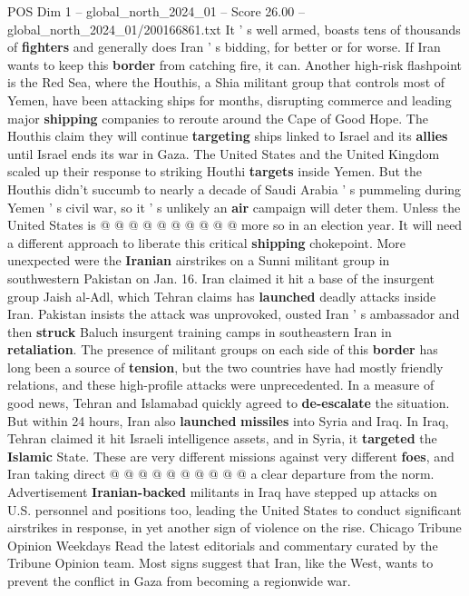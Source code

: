\begin{textsample}{POS Dim 1 – global\_north\_2024\_01 – Score 26.00 – global\_north\_2024\_01/200166861.txt}
It ' s well armed, boasts tens of thousands of \textbf{fighters} and generally does Iran ' s bidding, for better or for worse.
If Iran wants to keep this \textbf{border} from catching fire, it can.
Another high-risk flashpoint is the Red Sea, where the Houthis, a Shia militant group that controls most of Yemen, have been attacking ships for months, disrupting commerce and leading major \textbf{shipping} companies to reroute around the Cape of Good Hope.
The Houthis claim they will continue \textbf{targeting} ships linked to Israel and its \textbf{allies} until Israel ends its war in Gaza.
The United States and the United Kingdom scaled up their response to striking Houthi \textbf{targets} inside Yemen.
But the Houthis didn't succumb to nearly a decade of Saudi Arabia ' s pummeling during Yemen ' s civil war, so it ' s unlikely an \textbf{air} campaign will deter them.
Unless the United States is @ @ @ @ @ @ @ @ @ @ more so in an election year.
It will need a different approach to liberate this critical \textbf{shipping} chokepoint.
More unexpected were the \textbf{Iranian} airstrikes on a Sunni militant group in southwestern Pakistan on Jan. 16.
Iran claimed it hit a base of the insurgent group Jaish al-Adl, which Tehran claims has \textbf{launched} deadly attacks inside Iran.
Pakistan insists the attack was unprovoked, ousted Iran ' s ambassador and then \textbf{struck} Baluch insurgent training camps in southeastern Iran in \textbf{retaliation}.
The presence of militant groups on each side of this \textbf{border} has long been a source of \textbf{tension}, but the two countries have had mostly friendly relations, and these high-profile attacks were unprecedented.
In a measure of good news, Tehran and Islamabad quickly agreed to \textbf{de-escalate} the situation.
But within 24 hours, Iran also \textbf{launched} \textbf{missiles} into Syria and Iraq.
In Iraq, Tehran claimed it hit Israeli intelligence assets, and in Syria, it \textbf{targeted} the \textbf{Islamic} State.
These are very different missions against very different \textbf{foes}, and Iran taking direct @ @ @ @ @ @ @ @ @ @ a clear departure from the norm.
Advertisement \textbf{Iranian-backed} militants in Iraq have stepped up attacks on U.S. personnel and positions too, leading the United States to conduct significant airstrikes in response, in yet another sign of violence on the rise.
Chicago Tribune Opinion Weekdays Read the latest editorials and commentary curated by the Tribune Opinion team.
Most signs suggest that Iran, like the West, wants to prevent the conflict in Gaza from becoming a regionwide war.

\end{textsample}
